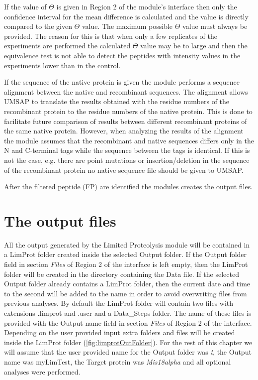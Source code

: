 If the value of $\Theta$ is given in Region \num{2} of the module's interface then only the confidence interval for the mean difference is calculated and the value is directly compared to the given $\Theta$ value. The maximum possible $\Theta$ value must always be provided. The reason for this is that when only a few replicates of the experiments are performed the calculated $\Theta$ value may be to large and then the equivalence test is not able to detect the peptides with intensity values in the experiments lower than in the control.

If the sequence of the native protein is given the module performs a sequence alignment between the native and recombinant sequences. The alignment allows UMSAP to translate the results obtained with the residue numbers of the recombinant protein to the residue numbers of the native protein. This is done to facilitate future comparison of results between different recombinant proteins of the same native protein. However, when analyzing the results of the alignment the module assumes that the recombinant and native sequences differs only in the N and C-terminal tags while the sequence between the tags is identical. If this is not the case, e.g. there are point mutations or insertion/deletion in the sequence of the recombinant protein no native sequence file should be given to UMSAP.

After the filtered peptide (FP) are identified the modules creates the output files.

\section{The output files}

All the output generated by the Limited Proteolysis module will be contained in a LimProt folder created inside the selected Output folder. If the Output folder field in section \textit{Files} of Region \num{2} of the interface is left empty, then the LimProt folder will be created in the directory containing the Data file. If the selected Output folder already contains a LimProt folder, then the current date and time to the second will be added to the name in order to avoid overwriting files from previous analyses. By default the LimProt folder will contain two files with extensions .limprot and .uscr and a Data{\_}Steps folder. The name of these files is provided with the Output name field in section \textit{Files} of Region \num{2} of the interface. Depending on the user provided input extra folders and files will be created inside the LimProt folder (\autoref{fig:limprotOutFolder}). For the rest of this chapter we will assume that the user provided name for the Output folder was \textit{t}, the Output name was myLimTest, the Target protein was \textit{Mis18alpha} and all optional analyses were performed.

